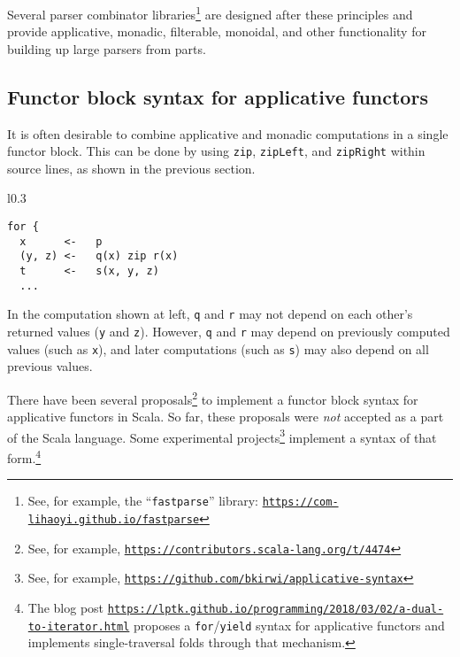 Several parser combinator libraries\footnote{See, for example, the \textsf{``}\texttt{fastparse}\textsf{''} library: \texttt{\href{https://com-lihaoyi.github.io/fastparse}{https://com-lihaoyi.github.io/fastparse}}}
are designed after these principles and provide applicative, monadic,
filterable, monoidal, and other functionality for building up large
parsers from parts.

\subsection{Functor block syntax for applicative functors}

It is often desirable to combine applicative and monadic computations
in a single functor block. This can be done by using \lstinline!zip!,
\lstinline!zipLeft!, and \lstinline!zipRight! within source lines,
as shown in the previous section.

\begin{wrapfigure}{l}{0.3\columnwidth}%
\vspace{-0.95\baselineskip}

\begin{lstlisting}
for {
  x      <-   p
  (y, z) <-   q(x) zip r(x)
  t      <-   s(x, y, z)
  ...
\end{lstlisting}
\vspace{-0.95\baselineskip}
\end{wrapfigure}%

\noindent In the computation shown at left, \lstinline!q! and \lstinline!r!
may not depend on each other\textsf{'}s returned values (\lstinline!y! and
\lstinline!z!). However, \lstinline!q! and \lstinline!r! may depend
on previously computed values (such as \lstinline!x!), and later
computations (such as \lstinline!s!) may also depend on all previous
values.

There have been several proposals\footnote{See, for example, \texttt{\href{https://contributors.scala-lang.org/t/4474}{https://contributors.scala-lang.org/t/4474}}}
to implement a functor block syntax for applicative functors in Scala.
So far, these proposals were \emph{not} accepted as a part of the
Scala language. Some experimental projects\footnote{See, for example, \texttt{\href{https://github.com/bkirwi/applicative-syntax}{https://github.com/bkirwi/applicative-syntax}}}
implement a syntax of that form.\footnote{The blog post \texttt{\href{https://lptk.github.io/programming/2018/03/02/a-dual-to-iterator.html}{https://lptk.github.io/programming/2018/03/02/a-dual-to-iterator.html}}
proposes a \lstinline!for!/\lstinline!yield! syntax for applicative
functors and implements single-traversal folds through that mechanism.}

